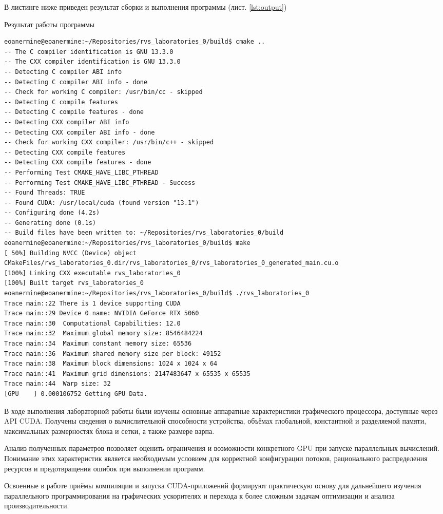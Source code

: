 \documentclass[14pt]{extarticle}
\makeatletter
\newenvironment{code}{\captionsetup{type=listing, belowskip=-14pt plus 3pt minus 0pt}}{}
\newcounter{sectionc} %
\newcommand{\nonumbersections}{\renewcommand{\Hy@numberline}[1]{}}
\let\oldsectionc\sectionc
\renewcommand{\sectionc}{\nonumbersections\oldsectionc}
\makeatother
\begin{document}
В листинге ниже приведен результат сборки и выполнения программы (лист. \ref{lst:output})

\begin{code}    
\caption{Результат работы программы\label{lst:output}}
\begin{verbatim}
eoanermine@eoanermine:~/Repositories/rvs_laboratories_0/build$ cmake ..
-- The C compiler identification is GNU 13.3.0
-- The CXX compiler identification is GNU 13.3.0
-- Detecting C compiler ABI info
-- Detecting C compiler ABI info - done
-- Check for working C compiler: /usr/bin/cc - skipped
-- Detecting C compile features
-- Detecting C compile features - done
-- Detecting CXX compiler ABI info
-- Detecting CXX compiler ABI info - done
-- Check for working CXX compiler: /usr/bin/c++ - skipped
-- Detecting CXX compile features
-- Detecting CXX compile features - done
-- Performing Test CMAKE_HAVE_LIBC_PTHREAD
-- Performing Test CMAKE_HAVE_LIBC_PTHREAD - Success
-- Found Threads: TRUE
-- Found CUDA: /usr/local/cuda (found version "13.1")
-- Configuring done (4.2s)
-- Generating done (0.1s)
-- Build files have been written to: ~/Repositories/rvs_laboratories_0/build
eoanermine@eoanermine:~/Repositories/rvs_laboratories_0/build$ make
[ 50%] Building NVCC (Device) object CMakeFiles/rvs_laboratories_0.dir/rvs_laboratories_0/rvs_laboratories_0_generated_main.cu.o
[100%] Linking CXX executable rvs_laboratories_0
[100%] Built target rvs_laboratories_0
eoanermine@eoanermine:~/Repositories/rvs_laboratories_0/build$ ./rvs_laboratories_0
Trace main::22 There is 1 device supporting CUDA
Trace main::29 Device 0 name: NVIDIA GeForce RTX 5060
Trace main::30  Computational Capabilities: 12.0
Trace main::32  Maximum global memory size: 8546484224
Trace main::34  Maximum constant memory size: 65536
Trace main::36  Maximum shared memory size per block: 49152
Trace main::38  Maximum block dimensions: 1024 x 1024 x 64
Trace main::41  Maximum grid dimensions: 2147483647 x 65535 x 65535
Trace main::44  Warp size: 32
[GPU    ] 0.000106752 Getting GPU Data.
\end{verbatim}
\end{code}


В ходе выполнения лабораторной работы были изучены основные аппаратные характеристики графического процессора, доступные через API CUDA. Получены сведения о вычислительной способности устройства, объёмах глобальной, константной и разделяемой памяти, максимальных размерностях блока и сетки, а также размере варпа.

Анализ полученных параметров позволяет оценить ограничения и возможности конкретного GPU при запуске параллельных вычислений. Понимание этих характеристик является необходимым условием для корректной конфигурации потоков, рационального распределения ресурсов и предотвращения ошибок при выполнении программ.

Освоенные в работе приёмы компиляции и запуска CUDA-приложений формируют практическую основу для дальнейшего изучения параллельного программирования на графических ускорителях и перехода к более сложным задачам оптимизации и анализа производительности.
\end{document}
